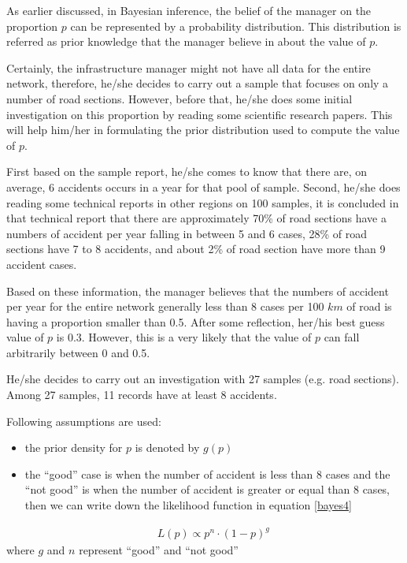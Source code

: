 As earlier discussed, in Bayesian inference, the belief of the manager on the proportion $p$ can be represented by a probability distribution. This distribution is referred as prior knowledge that the manager believe in about the value of $p$.

Certainly, the infrastructure manager might not have all data for the entire network, therefore, he/she decides to carry out a sample that focuses on only a number of road sections. However, before that, he/she does some initial investigation on this proportion by reading some scientific research papers. This will help him/her in formulating the prior distribution used to compute the value of $p$.

First based on the sample report, he/she comes to know that there are, on average, 6 accidents occurs in a year for that pool of sample. Second, he/she does reading some technical reports in other regions on 100 samples, it is concluded in that technical report that there are approximately 70\% of road sections have a numbers of accident per year falling in between 5 and 6 cases, 28\% of road sections have 7 to 8 accidents, and about 2\% of road section have more than 9 accident cases.

Based on these information, the manager believes that the numbers of accident per year for the entire network generally less than 8 cases per 100 $km$ of road is having a proportion smaller than 0.5. After some reflection, her/his best guess value of $p$ is 0.3. However, this is a very likely that the value of $p$ can fall arbitrarily between 0 and 0.5.

He/she decides to carry out an investigation with 27 samples (e.g. road sections). Among 27 samples, 11 records have at least 8 accidents. 

Following assumptions are used:
\begin{itemize}
\item the prior density for $p$ is denoted by $g(p)$
\item the “good” case is when the number of accident is less than 8 cases and the “not good” is when the number of accident is greater or equal than 8 cases, then we can write down the likelihood function in equation \eqref{bayes4}                                                                                                                                                                                                                          \end{itemize}
\begin{eqnarray}
&& L(p) \propto p^n \cdot (1-p)^g\label{bayes4}
\end{eqnarray}
where $g$ and $n$ represent “good” and “not good”

